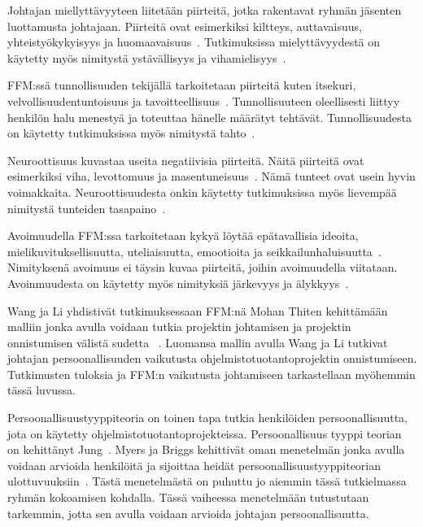 \documentclass[finnish]{tktltiki2}
\theoremstyle{definition}
\theoremstyle{remark}
\begin{document}
Johtajan miellyttävyyteen liitetään piirteitä, jotka rakentavat ryhmän jäsenten luottamusta johtajaan. Piirteitä ovat esimerkiksi kiltteys, auttavaisuus, yhteistyökykyisyys ja huomaavaisuus~\cite{Wang:2009:PMP:1639950.1640049}. Tutkimuksissa mielyttävyydestä on käytetty myös nimitystä ystävällisyys ja vihamielisyys~\cite{digman1990personality}.

FFM:ssä tunnollisuuden tekijällä tarkoitetaan piirteitä kuten itsekuri, velvollisuudentuntoisuus ja tavoitteellisuus~\cite{Wang:2009:PMP:1639950.1640049}. Tunnollisuuteen oleellisesti liittyy henkilön halu menestyä ja toteuttaa hänelle määrätyt tehtävät. Tunnollisuudesta on käytetty tutkimuksissa myös nimitystä tahto~\cite{digman1990personality}.

Neuroottisuus kuvastaa useita negatiivisia piirteitä. Näitä piirteitä ovat esimerkiksi viha, levottomuus ja masentuneisuus~\cite{Wang:2009:PMP:1639950.1640049}. Nämä tunteet ovat usein hyvin voimakkaita. Neuroottisuudesta onkin käytetty tutkimuksissa myös lievempää nimitystä tunteiden tasapaino~\cite{digman1990personality}.

Avoimuudella FFM:ssa tarkoitetaan kykyä löytää epätavallisia ideoita, mielikuvituksellisuutta, uteliaisuutta, emootioita ja seikkailunhaluisuutta~\cite{Wang:2009:PMP:1639950.1640049}. Nimityksenä avoimuus ei täysin kuvaa piirteitä, joihin avoimuudella viitataan. Avoinmuudesta on käytetty myös nimityksiä järkevyys ja älykkyys~\cite{digman1990personality}.

Wang ja Li yhdistivät tutkimuksessaan FFM:nä Mohan Thiten kehittämään malliin jonka avulla voidaan tutkia projektin johtamisen ja projektin onnistumisen välistä sudetta ~\cite{Wang:2009:PMP:1639950.1640049}. Luomansa mallin avulla Wang ja Li tutkivat johtajan persoonallisuuden vaikutusta ohjelmistotuotantoprojektin onnistumiseen. Tutkimusten tuloksia ja FFM:n vaikutusta johtamiseen tarkastellaan myöhemmin tässä luvussa.

Persoonallisuustyyppiteoria on toinen tapa tutkia henkilöiden persoonallisuutta, jota on käytetty ohjelmistotuotantoprojekteissa. Persoonallisuus tyyppi teorian on kehittänyt Jung~\cite{jung1989psychological}. Myers ja Briggs kehittivät oman menetelmän jonka avulla voidaan arvioida henkilöitä ja sijoittaa heidät persoonallisuustyyppiteorian ulottuvuuksiin~\cite{myers1985manual}. Tästä menetelmästä on puhuttu jo aiemmin tässä tutkielmassa ryhmän kokoamisen kohdalla. Tässä vaiheessa menetelmään tutustutaan tarkemmin, jotta sen avulla voidaan arvioida johtajan persoonallisuutta.
\end{document}
